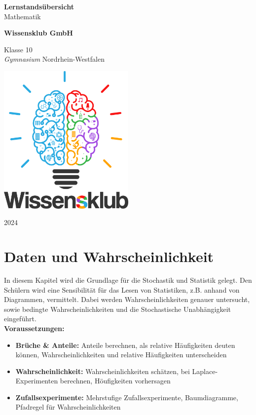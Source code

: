 \documentclass{article}
\begin{document}
\begin{titlepage}
    \begin{center}
        \vspace*{1cm}
            
        \Huge
        \textbf{Lernstandsübersicht}\\            
        \vspace{0.5cm}
        \LARGE
        Mathematik
            
        \vspace{1.5cm}
            
        \textbf{Wissensklub GmbH}
            
        \vfill
            
        Klasse 10\\
        \textit{Gymnasium} Nordrhein-Westfalen
            
        \vspace{0.8cm}
            
        \includegraphics[width=0.5\textwidth]{Wissensklub-Logo.png}
            
        \Large
        2024          
    \end{center}
\end{titlepage}

\section{Daten und Wahrscheinlichkeit}
In diesem Kapitel wird die Grundlage für die Stochastik und Statistik gelegt. 
Den Schülern wird eine Sensibilität für das Lesen von Statistiken, z.B. anhand von Diagrammen, vermittelt.
Dabei werden Wahrscheinlichkeiten genauer untersucht, sowie bedingte Wahrscheinlichkeiten und die Stochastische Unabhängigkeit eingeführt.\\
\textbf{Voraussetzungen: }
\begin{itemize}
    \item \textbf{Brüche \& Anteile: } Anteile berechnen, als relative Häufigkeiten deuten können, Wahrscheinlichkeiten und relative Häufigkeiten unterscheiden
    \item \textbf{Wahrscheinlichkeit: } Wahrscheinlichkeiten schätzen, bei Laplace-Experimenten berechnen, Höufigkeiten vorhersagen
    \item \textbf{Zufallsexperimente: } Mehrstufige Zufallsexperimente, Baumdiagramme, Pfadregel für Wahrscheinlichkeiten 
\end{itemize}
\end{document}
